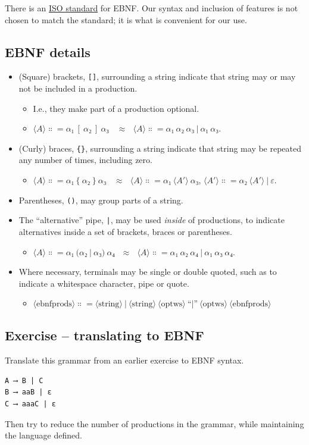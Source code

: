 \documentclass[11pt]{article}
\theoremstyle{definition}
\begin{document}
There is an \href{https://www.iso.org/standard/26153.html}{ISO standard} for EBNF.
Our syntax and inclusion of features is
not chosen to match the standard;
it is what is convenient for our use.

\subsection{EBNF details}
\label{sec:org326949e}
\begin{itemize}
\item (Square) brackets, \texttt{[]}, surrounding a string
indicate that string may or may not be included in a production.
\begin{itemize}
\item I.e., they make part of a production optional.
\item \(⟨A⟩ ∷= α₁\ [\ α₂\ ]\ α₃\ \ \ \ ≈ \ \ \ ⟨A⟩ ∷= α₁\ α₂\ α₃\ |\ α₁\ α₃\).
\end{itemize}
\item (Curly) braces, \texttt{\{\}}, surrounding a string
indicate that string may be repeated any number of times,
including zero.
\begin{itemize}
\item \(⟨A⟩ ∷= α₁\ \{\ α₂\ \}\ α₃\ \ \ \ ≈ \ \ \ ⟨A⟩ ∷= α₁\ ⟨A′⟩\ α₃\), \(⟨A′⟩ ∷= α₂\ ⟨A′⟩\ |\ ε\).
\end{itemize}
\item Parentheses, \texttt{()}, may group parts of a string.
\item The “alternative” pipe, \texttt{|}, may be used \emph{inside} of productions,
to indicate alternatives inside a set of brackets, braces
or parentheses.
\begin{itemize}
\item \(⟨A⟩ ∷= α₁\ (α₂\ |\ α₃)\ α₄ \ \ \ ≈ \ \ \ ⟨A⟩ ∷= α₁\ α₂\ α₄\ |\ α₁\ α₃\ α₄\).
\end{itemize}
\item Where necessary, terminals may be single or double quoted,
such as to indicate a whitespace character, pipe or quote.
\begin{itemize}
\item \(⟨\text{ebnfprods}⟩ ∷= ⟨\text{string}⟩\ |\ ⟨\text{string}⟩\ ⟨\text{optws}⟩\ “|”\ ⟨\text{optws}⟩\ ⟨\text{ebnfprods}⟩\)
\end{itemize}
\end{itemize}

\subsection{Exercise – translating to EBNF}
\label{sec:orgba7cfc1}
Translate this grammar from an earlier exercise to EBNF syntax.
\begin{verbatim}
A ⟶ B | C
B ⟶ aaB | ε
C ⟶ aaaC | ε
\end{verbatim}
Then try to reduce the number of productions in the grammar,
while maintaining the language defined.
\end{document}
